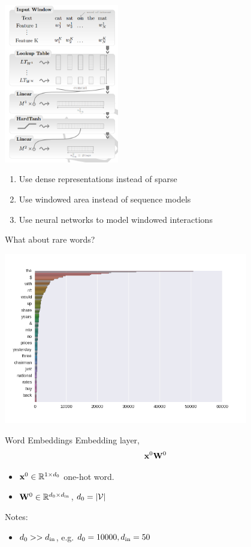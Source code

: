 \documentclass{beamer}
\begin{document}
\begin{frame}
  \begin{center}
    \includegraphics[width=5cm]{cwfull}
  \end{center}
  \begin{enumerate}
  \item Use dense representations instead of sparse
  \item Use windowed area instead of sequence models
  \item Use neural networks to model windowed interactions
  \end{enumerate}
\end{frame}


\begin{frame}{What about rare words?}
  \begin{center}
    \includegraphics[width=0.8\textwidth]{../notebooks/zipf}
  \end{center}
\end{frame}

\begin{frame}{Word Embeddings}
  Embedding layer,
  \[ \mathbf{x}^0 \mathbf{W}^0 \]
  \begin{itemize}
  \item $\mathbf{x}^0 \in \mathbb{R}^{1 \times d_0}$ one-hot word.
  \item $\mathbf{W}^0 \in \mathbb{R}^{d_0 \times {d_{\mathrm{in}}}}$, $d_0 = |\mathcal{V}|$
  \end{itemize}
  \air
  Notes:
  \begin{itemize}
  \item $d_0 >> {d_{\mathrm{in}}}$, e.g. $d_0 = 10000, {d_{\mathrm{in}}} = 50$
  \end{itemize}
\end{frame}
\end{document}
